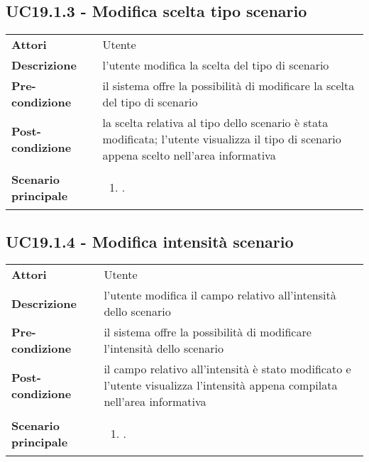 \subsection{UC19.1.3 - Modifica scelta tipo scenario} 
\label{sssec:UC19.1.3} 
\def\arraystretch{1.5}
\begin{tabularx}{\textwidth}{l|p{}}
	\rowcolor{I} \multicolumn{2}{c}{\color{white}\textbf{UC19.1.3 - Modifica scelta tipo scenario}} \\
	\toprule
	\endhead
	\textbf{Attori} & Utente\\
	\textbf{Descrizione} & l'utente modifica la scelta del tipo di scenario\\
	\textbf{Pre-condizione} & il sistema offre la possibilità di modificare la scelta del tipo di scenario\\
	\textbf{Post-condizione} & la scelta relativa al tipo dello scenario è stata modificata; l'utente visualizza il tipo di scenario appena scelto nell'area informativa\\
	\textbf{Scenario principale} & \vspace{-1.2em}\begin{enumerate}[leftmargin=*,noitemsep,nosep]
		\item \nameref{sssec:UC19.1.3}.
	\end{enumerate}\\
	\bottomrule
\end{tabularx}
\subsection{UC19.1.4 - Modifica intensità scenario} 
\label{sssec:UC19.1.4} 
\def\arraystretch{1.5}
\begin{tabularx}{\textwidth}{l|p{}}
	\rowcolor{I} \multicolumn{2}{c}{\color{white}\textbf{UC19.1.4 - Modifica intensità scenario}} \\
	\toprule
	\endhead
	\textbf{Attori} & Utente\\
	\textbf{Descrizione} & l'utente modifica il campo relativo all'intensità dello scenario\\
	\textbf{Pre-condizione} & il sistema offre la possibilità di modificare l'intensità dello scenario\\
	\textbf{Post-condizione} & il campo relativo  all'intensità è stato modificato e l'utente visualizza l'intensità appena compilata nell'area informativa\\
	\textbf{Scenario principale} & \vspace{-1.2em}\begin{enumerate}[leftmargin=*,noitemsep,nosep]
		\item \nameref{sssec:UC19.1.4}.
	\end{enumerate}\\
	\bottomrule
\end{tabularx}
